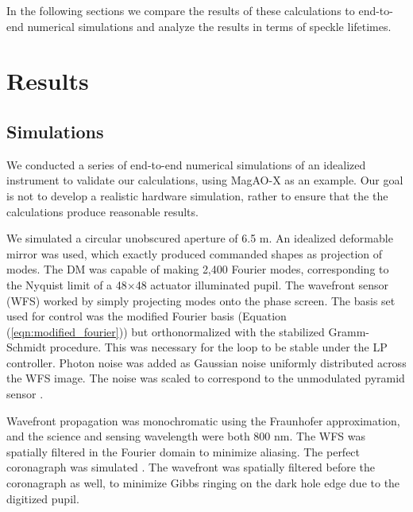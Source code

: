 \documentclass[10pt,preprint]{aastex631}
\begin{document}
In the following sections we compare the results of these calculations to end-to-end numerical simulations and analyze the results in terms of speckle lifetimes.




\section{Results}
\label{sec:results}


\subsection{Simulations}
\label{sec:simulations}
We conducted a series of end-to-end numerical simulations of an idealized instrument to validate our calculations, using MagAO-X \citep{2020SPIE11448E..4LM} as an example.  Our goal is not to develop a realistic hardware simulation, rather to ensure that the the calculations produce reasonable results. 

We simulated a circular unobscured aperture of 6.5 m.   An idealized deformable mirror was used, which exactly produced commanded shapes as projection of modes.  The DM was capable of making 2,400 Fourier modes, corresponding to the Nyquist limit of a 48$\times$48 actuator illuminated pupil.  The wavefront sensor (WFS) worked by simply projecting modes onto the phase screen.  The basis set used for control was the modified Fourier basis (Equation (\ref{eqn:modified_fourier})) but orthonormalized with the stabilized Gramm-Schmidt procedure.  This was necessary for the loop to be stable under the LP controller.  Photon noise was added as Gaussian noise uniformly distributed across the WFS image.  The noise was scaled to correspond to the unmodulated pyramid sensor  \cite[$\beta_p = \sqrt{2}$,][]{2005ApJ...629..592G}.

Wavefront propagation was monochromatic using the Fraunhofer approximation, and the science and sensing wavelength were both 800 nm.  The WFS was spatially filtered in the Fourier domain to minimize aliasing.  The perfect coronagraph was simulated \textbf{\citep{2006A&A...447..397C}}.  The wavefront was spatially filtered before the coronagraph as well, to minimize Gibbs ringing on the dark hole edge due to the digitized pupil.
\end{document}
